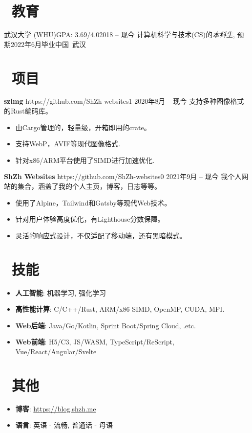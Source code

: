 \documentclass{common}
\begin{document}

\section{\faGraduationCap\ 教育}
\educationsubsection
    {武汉大学 (WHU)}{GPA: 3.69/4.0}{2018 -- 现今}
    {计算机科学与技术(CS)的\textit{本科生}, 预期2022年6月毕业}{中国\ 武汉}

\section{\faCubes\ 项目}
\projectsubsection
    {\textbf{szimg}}
    {https://github.com/ShZh-websites}{1}
    {2020年8月 -- 现今}
支持多种图像格式的Rust编码库。
\begin{itemize}
    \item 由Cargo管理的，轻量级，开箱即用的crate。
    \item 支持WebP，AVIF等现代图像格式.
    \item 针对x86/ARM平台使用了SIMD进行加速优化.
\end{itemize}
\projectsubsection
    {\textbf{ShZh Websites}}
    {https://github.com/ShZh-websites}{0}
    {2021年9月 -- 现今}
我个人网站的集合，涵盖了我的个人主页，博客，日志等等。
\begin{itemize}
    \item 使用了Alpine，Tailwind和Gatsby等现代Web技术。
    \item 针对用户体验高度优化，有Lighthouse分数保障。
    \item 灵活的响应式设计，不仅适配了移动端，还有黑暗模式。
\end{itemize}

\section{\faCogs\ 技能}
\begin{itemize}[parsep=0.5ex]
    \item \textbf{人工智能}: 机器学习, 强化学习
    \item \textbf{高性能计算}: C/C++/Rust, ARM/x86 SIMD, OpenMP, CUDA, MPI.
    \item \textbf{Web后端}: Java/Go/Kotlin, Sprint Boot/Spring Cloud, .etc.
    \item \textbf{Web前端}: H5/C3, JS/WASM, TypeScript/ReScript, Vue/React/Angular/Svelte
\end{itemize}

\section{\faInfo\ 其他}
\begin{itemize}[parsep=0.5ex]
    \item \textbf{博客}: \href{https://blog.shzh.me}{https://blog.shzh.me}
    \item \textbf{语言}: 英语 - 流畅, 普通话 - 母语
\end{itemize}
\end{document}
